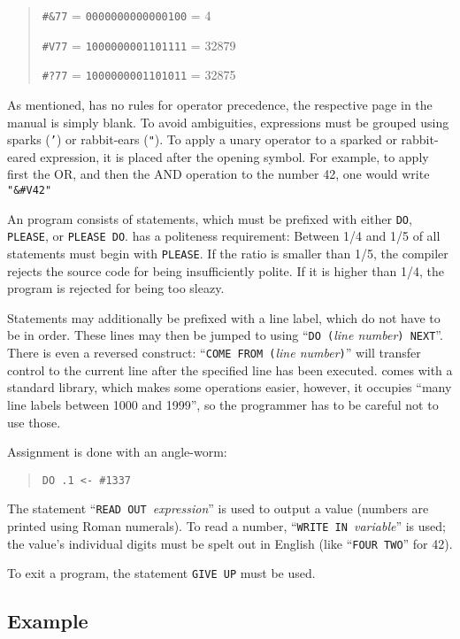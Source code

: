 \begin{quotation}
\texttt{\#\&77} = \texttt{0000000000000100} = 4

\texttt{\#V77} = \texttt{1000000001101111} = 32879

\texttt{\#?77} = \texttt{1000000001101011} = 32875
\end{quotation}

As mentioned, \ic{} has no rules for operator precedence, the respective page in the manual is simply blank. To avoid ambiguities, expressions must be grouped using sparks (\texttt{'}) or rabbit-ears (\texttt{"}). To apply a unary operator to a sparked or rabbit-eared expression, it is placed after the opening symbol. For example, to apply first the OR, and then the AND operation to the number 42, one would write \texttt{"\&\#V42"}

An \ic{} program consists of statements, which must be prefixed with either \texttt{DO}, \texttt{PLEASE}, or \texttt{PLEASE DO}. \ic{} has a politeness requirement: Between 1/4 and 1/5 of all statements must begin with \texttt{PLEASE}. If the ratio is smaller than 1/5, the compiler rejects the source code for being insufficiently polite. If it is higher than 1/4, the program is rejected for being too sleazy.

Statements may additionally be prefixed with a line label, which do not have to be in order. These lines may then be jumped to using “\texttt{DO (}\emph{line number}\texttt{) NEXT}”. There is even a reversed construct: “\texttt{COME FROM (}\emph{line number}\texttt{)}” will transfer control to the current line after the specified line has been executed. \ic{} comes with a standard library, which makes some operations easier, however, it occupies “many line labels between 1000 and 1999”, so the programmer has to be careful not to use those.

Assignment is done with an angle-worm:

\begin{quotation}
    \texttt{DO .1 <- \#1337}
\end{quotation}

The statement “\texttt{READ OUT }\emph{expression}” is used to output a value (numbers are printed using Roman numerals). To read a number, “\texttt{WRITE IN }\emph{variable}” is used; the value's individual digits must be spelt out in English (like “\texttt{FOUR TWO}” for 42).

To exit a program, the statement \texttt{GIVE UP} must be used.

\subsection{Example}

